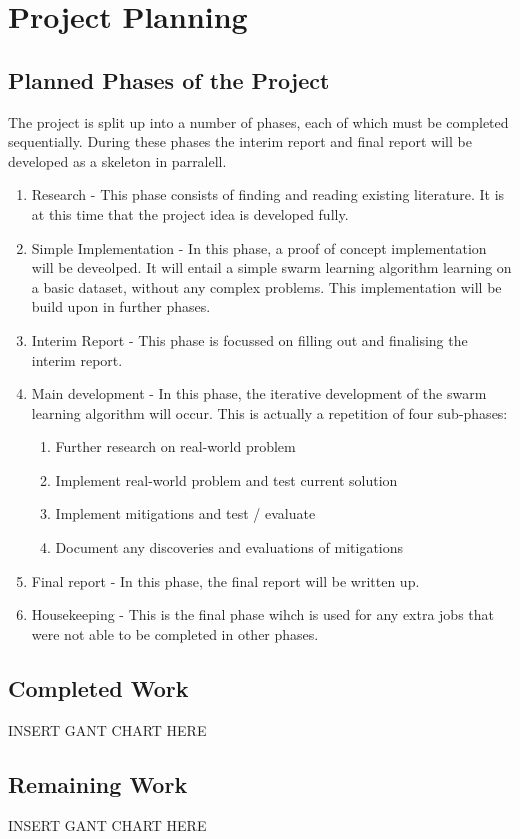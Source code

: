 \chapter{Project Planning}
\section{Planned Phases of the Project}
The project is split up into a number of phases, each of which must be completed sequentially. During these phases the interim report and final report will be developed as a skeleton in parralell.
\begin{enumerate}
	\item Research - This phase consists of finding and reading existing literature. It is at this time that the project idea is developed fully.
	\item Simple Implementation - In this phase, a proof of concept implementation will be deveolped. It will entail a simple swarm learning algorithm learning on a basic dataset, without any complex problems. This implementation will be build upon in further phases.
	\item Interim Report - This phase is focussed on filling out and finalising the interim report.
	\item Main development - In this phase, the iterative development of the swarm learning algorithm will occur. This is actually a repetition of four sub-phases:
	\begin{enumerate}
		\item Further research on real-world problem
		\item Implement real-world problem and test current solution
		\item Implement mitigations and test / evaluate
		\item Document any discoveries and evaluations of mitigations
	\end{enumerate}
	\item Final report - In this phase, the final report will be written up.
	\item Housekeeping - This is the final phase wihch is used for any extra jobs that were not able to be completed in other phases.
\end{enumerate}
\section{Completed Work}
INSERT GANT CHART HERE
\section{Remaining Work}
INSERT GANT CHART HERE